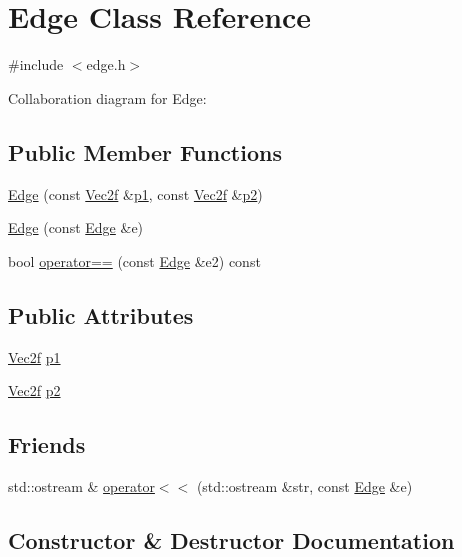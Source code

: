 \hypertarget{class_edge}{}\section{Edge Class Reference}
\label{class_edge}


{\ttfamily \#include $<$edge.h$>$}



Collaboration diagram for Edge:
\subsection*{Public Member Functions}
\begin{DoxyCompactItemize}
\item 
\hyperlink{class_edge_a46424efbe9a3753f10ed69734968b42a}{Edge} (const \hyperlink{class_vec2f}{Vec2f} \&\hyperlink{class_edge_a52f5f3c82f0241458a80008649cf2669}{p1}, const \hyperlink{class_vec2f}{Vec2f} \&\hyperlink{class_edge_a1f8d9abda73daf83db1780825ae0be0c}{p2})
\item 
\hyperlink{class_edge_a70ed9f4d5f93c9cc5273a34361781532}{Edge} (const \hyperlink{class_edge}{Edge} \&e)
\item 
bool \hyperlink{class_edge_a23eeba05e956cd2a398280537f0c518f}{operator==} (const \hyperlink{class_edge}{Edge} \&e2) const 
\end{DoxyCompactItemize}
\subsection*{Public Attributes}
\begin{DoxyCompactItemize}
\item 
\hyperlink{class_vec2f}{Vec2f} \hyperlink{class_edge_a52f5f3c82f0241458a80008649cf2669}{p1}
\item 
\hyperlink{class_vec2f}{Vec2f} \hyperlink{class_edge_a1f8d9abda73daf83db1780825ae0be0c}{p2}
\end{DoxyCompactItemize}
\subsection*{Friends}
\begin{DoxyCompactItemize}
\item 
std::ostream \& \hyperlink{class_edge_a05e7e89dad7ec4c7ea81da0b1f487a78}{operator$<$$<$} (std::ostream \&str, const \hyperlink{class_edge}{Edge} \&e)
\end{DoxyCompactItemize}


\subsection{Constructor \& Destructor Documentation}
